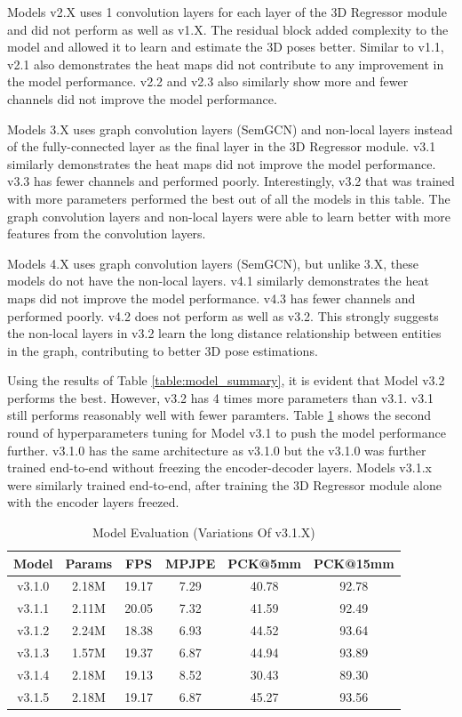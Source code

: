 \noindent
Models v2.X uses 1 convolution layers for each layer of the 3D Regressor module and did not perform as well as v1.X. The residual block added complexity to the model and allowed it to learn and estimate the 3D poses better. Similar to v1.1, v2.1 also demonstrates the heat maps did not contribute to any improvement in the model performance. v2.2 and v2.3 also similarly show more and fewer channels did not improve the model performance.

\noindent
Models 3.X uses graph convolution layers (SemGCN) and non-local layers instead of the fully-connected layer as the final layer in the 3D Regressor module. v3.1 similarly demonstrates the heat maps did not improve the model performance. v3.3 has fewer channels and performed poorly. Interestingly, v3.2 that was trained with more parameters performed the best out of all the models in this table. The graph convolution layers and non-local layers were able to learn better with more features from the convolution layers.

\noindent
Models 4.X uses graph convolution layers (SemGCN), but unlike 3.X, these models do not have the non-local layers. v4.1 similarly demonstrates the heat maps did not improve the model performance. v4.3 has fewer channels and performed poorly. v4.2 does not perform as well as v3.2. This strongly suggests the non-local layers in v3.2 learn the long distance relationship between entities in the graph, contributing to better 3D pose estimations.

\noindent
Using the results of Table \ref{table:model_summary}, it is evident that Model v3.2 performs the best. However, v3.2 has 4 times more parameters than v3.1. v3.1 still performs reasonably well with fewer paramters. Table \ref{table:model_evaluation_fc} shows the second round of hyperparameters tuning for Model v3.1 to push the model performance further. v3.1.0 has the same architecture as v3.1.0 but the v3.1.0 was further trained end-to-end without freezing the encoder-decoder layers. Models v3.1.x were similarly trained end-to-end, after training the 3D Regressor module alone with the encoder layers freezed.

\begin{table}[ht!]
\centering
\begin{tabular*}{\textwidth}{c @{\extracolsep{\fill}} ccccc}
\hline
Model & Params & FPS & MPJPE & PCK@5mm & PCK@15mm \\
\hline
v3.1.0 & 2.18M & 19.17 & 7.29 & 40.78 & 92.78 \\
v3.1.1 & 2.11M & 20.05 & 7.32 & 41.59 & 92.49 \\
v3.1.2 & 2.24M & 18.38 & 6.93 & 44.52 & 93.64 \\
v3.1.3 & 1.57M & 19.37 & 6.87 & 44.94 & 93.89 \\
v3.1.4 & 2.18M & 19.13 & 8.52 & 30.43 & 89.30 \\
v3.1.5 & 2.18M & 19.17 & 6.87 & 45.27 & 93.56 \\
[1ex] 
\hline
\end{tabular*}
\caption{Model Evaluation (Variations Of v3.1.X)}
\label{table:model_evaluation_fc}
\end{table}

